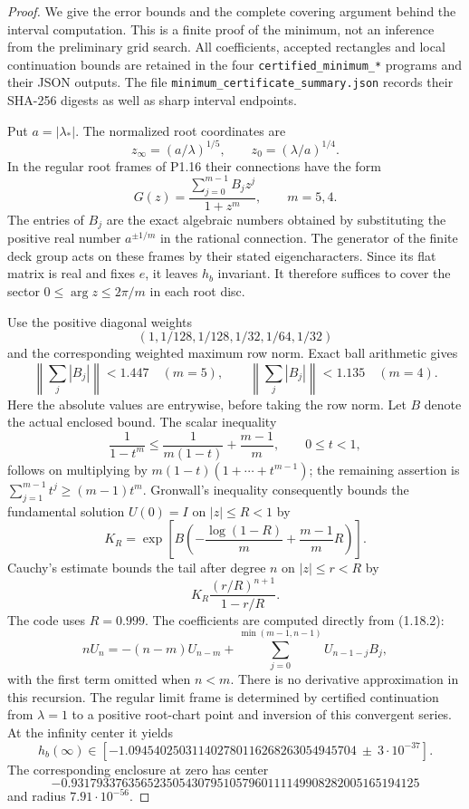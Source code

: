 \begin{proof}
We give the error bounds and the complete covering argument behind
the interval computation.  This is a finite proof of the minimum,
not an inference from the preliminary grid search.  All coefficients,
accepted rectangles and local continuation bounds are retained in the
four \texttt{certified\_minimum\_*} programs and their JSON outputs.
The file \texttt{minimum\_certificate\_summary.json} records their
SHA-256 digests as well as sharp interval endpoints.

Put $a=|\lambda_*|$.  The normalized root coordinates are
\[
 z_\infty=(a/\lambda)^{1/5},\qquad
 z_0=(\lambda/a)^{1/4}.
\]
In the regular root frames of P1.16 their connections have the form
\[
 G(z)=\frac{\sum_{j=0}^{m-1}B_jz^j}{1+z^m},\qquad m=5,4.
\tag{1.18.2}
\]
The entries of $B_j$ are the exact algebraic numbers obtained by
substituting the positive real number $a^{\pm1/m}$ in the rational
connection.  The generator of the finite deck group acts on these
frames by their stated eigencharacters.  Since its flat matrix is
real and fixes $e$, it leaves $h_b$ invariant.  It therefore suffices
to cover the sector $0\leq\arg z\leq2\pi/m$ in each root disc.

Use the positive diagonal weights
\[
 (1,1/128,1/128,1/32,1/64,1/32)
\]
and the corresponding weighted maximum row norm.  Exact ball
arithmetic gives
\[
 \left\|\sum_j |B_j|\right\|<1.447\quad(m=5),\qquad
 \left\|\sum_j |B_j|\right\|<1.135\quad(m=4).
\]
Here the absolute values are entrywise, before taking the row norm.
Let $B$ denote the actual enclosed bound.  The scalar inequality
\[
 \frac1{1-t^m}\leq\frac1{m(1-t)}+\frac{m-1}{m},\qquad0\leq t<1,
\]
follows on multiplying by $m(1-t)(1+\cdots+t^{m-1})$;
the remaining assertion is
$\sum_{j=1}^{m-1}t^j\geq(m-1)t^m$.
Gronwall's inequality consequently bounds the fundamental solution
$U(0)=I$ on $|z|\leq R<1$ by
\[
 K_R=\exp\!\left[B\left(-\frac{\log(1-R)}m
                    +\frac{m-1}{m}R\right)\right].
\]
Cauchy's estimate bounds the tail after degree $n$ on $|z|\leq r<R$
by
\[
 K_R\frac{(r/R)^{n+1}}{1-r/R}.
\tag{1.18.3}
\]
The code uses $R=0.999$.  The coefficients are computed directly
from (1.18.2):
\[
 nU_n=-(n-m)U_{n-m}
       +\sum_{j=0}^{\min(m-1,n-1)}U_{n-1-j}B_j,
\]
with the first term omitted when $n<m$.
There is no derivative approximation in this recursion.
The regular limit frame is determined by certified continuation
from $\lambda=1$ to a positive root-chart point and inversion of
this convergent series.  At the infinity center it yields
\[
 h_b(\infty)\in
 [-1.094540250311402780116268263054945704
       \ \mathbin{\pm}\ 3\cdot10^{-37}].
\tag{1.18.4}
\]
The corresponding enclosure at zero has center
\[
-0.9317933763565235054307951057960111149908282005165194125
\]
and radius $7.91\cdot10^{-56}$.


\end{proof}
